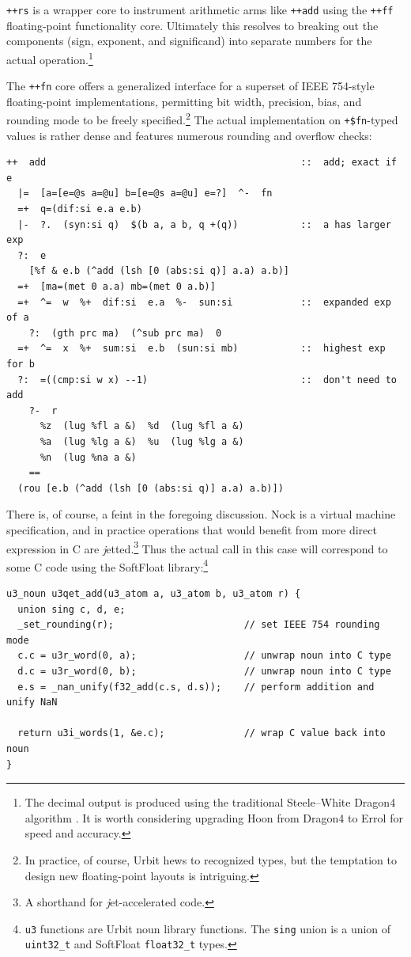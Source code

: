 \documentclass[twoside]{article}
\begin{document}
\texttt{++rs} is a wrapper core to instrument arithmetic arms like \texttt{++add} using the \texttt{++ff} floating-point functionality core.  Ultimately this resolves to breaking out the components (sign, exponent, and significand) into separate numbers for the actual operation.\footnote{The decimal output is produced using the traditional Steele–White Dragon4 algorithm \citep{Steele1991}.  It is worth considering upgrading Hoon from Dragon4 to Errol \citep{Andrysco2016} for speed and accuracy.}

The \texttt{++fn} core offers a generalized interface for a superset of IEEE 754-style floating-point implementations, permitting bit width, precision, bias, and rounding mode to be freely specified.\footnote{In practice, of course, Urbit hews to recognized types, but the temptation to design new floating-point layouts is intriguing.}  The actual implementation on \texttt{+\$fn}-typed values is rather dense and features numerous rounding and overflow checks:

\lstset{language=Hoon}
\begin{lstlisting}
++  add                                             ::  add; exact if e
  |=  [a=[e=@s a=@u] b=[e=@s a=@u] e=?]  ^-  fn
  =+  q=(dif:si e.a e.b)
  |-  ?.  (syn:si q)  $(b a, a b, q +(q))           ::  a has larger exp
  ?:  e
    [%f & e.b (^add (lsh [0 (abs:si q)] a.a) a.b)]
  =+  [ma=(met 0 a.a) mb=(met 0 a.b)]
  =+  ^=  w  %+  dif:si  e.a  %-  sun:si            ::  expanded exp of a
    ?:  (gth prc ma)  (^sub prc ma)  0
  =+  ^=  x  %+  sum:si  e.b  (sun:si mb)           ::  highest exp for b
  ?:  =((cmp:si w x) --1)                           ::  don't need to add
    ?-  r
      %z  (lug %fl a &)  %d  (lug %fl a &)
      %a  (lug %lg a &)  %u  (lug %lg a &)
      %n  (lug %na a &)
    ==
  (rou [e.b (^add (lsh [0 (abs:si q)] a.a) a.b)])
\end{lstlisting}

There is, of course, a feint in the foregoing discussion.  Nock is a virtual machine specification, and in practice operations that would benefit from more direct expression in C are {\emph jetted}.\footnote{A shorthand for {\emph jet-accelerated code}.}  Thus the actual call in this case will correspond to some C code using the SoftFloat library:\footnote{\texttt{u3} functions are Urbit noun library functions.  The \texttt{sing} union is a union of \texttt{uint32\_t} and SoftFloat \texttt{float32\_t} types.}

\lstset{language=C}
\begin{lstlisting}
u3_noun u3qet_add(u3_atom a, u3_atom b, u3_atom r) {
  union sing c, d, e;
  _set_rounding(r);                       // set IEEE 754 rounding mode
  c.c = u3r_word(0, a);                   // unwrap noun into C type
  d.c = u3r_word(0, b);                   // unwrap noun into C type
  e.s = _nan_unify(f32_add(c.s, d.s));    // perform addition and unify NaN

  return u3i_words(1, &e.c);              // wrap C value back into noun
}
\end{lstlisting}
\end{document}
